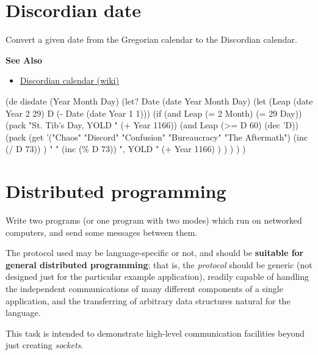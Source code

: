 \pagebreak{}
\section*{Discordian date}

Convert a given date from the Gregorian calendar to the Discordian
calendar.

\textbf{See Also}

\begin{itemize}
\item
  \href{http://en.wikipedia.org/wiki/Discordian\_calendar}{Discordian
  calendar (wiki)}
\end{itemize}


\begin{wideverbatim}

(de disdate (Year Month Day)
   (let? Date (date Year Month Day)
      (let (Leap (date Year 2 29)  D (- Date (date Year 1 1)))
         (if (and Leap (= 2 Month) (= 29 Day))
            (pack "St. Tib's Day, YOLD " (+ Year 1166))
            (and Leap (>= D 60) (dec 'D))
            (pack
               (get
                  '("Chaos" "Discord" "Confusion" "Bureaucracy" "The Aftermath")
                  (inc (/ D 73)) )
               " "
               (inc (\% D 73))
               ", YOLD "
               (+ Year 1166) ) ) ) ) )

\end{wideverbatim}

\pagebreak{}
\section*{Distributed programming}

Write two programs (or one program with two modes) which run on
networked computers, and send some messages between them.

The protocol used may be language-specific or not, and should be
\textbf{suitable for general distributed programming}; that is, the
\emph{protocol} should be generic (not designed just for the particular
example application), readily capable of handling the independent
communications of many different components of a single application, and
the transferring of arbitrary data structures natural for the language.

This task is intended to demonstrate high-level communication
facilities beyond just creating \emph{sockets}.



